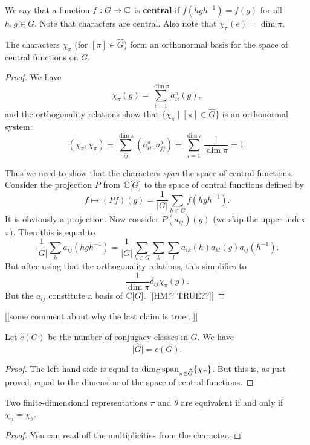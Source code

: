 \documentclass[11pt, english]{article}
\begin{document}
We say that a function $f:G \to \mathbb{C}$ is \textbf{central} if $f(hgh^{-1})=f(g)$ for all $h,g \in G$. Note that characters are central. Also note that $\chi_\pi(e)=\dim \pi$. 

\begin{thm}
 The characters $\chi_\pi$ (for $[\pi] \in \widehat G$) form an orthonormal basis for the space of central functions on $G$.
\end{thm}
\begin{proof}
 We have
$$
\chi_\pi(g) = \sum_{i=1}^{\dim \pi} a_{ii}^\pi(g),
$$
and the orthogonality relations show that $\{ \chi_\pi \mid [\pi] \in \widehat G \}$ is an orthonormal system:
$$
(\chi_\pi, \chi_\pi) = \sum_{ij}^{\dim \pi} (a_{ii}^\pi, a_{jj}^\pi) = 
\sum_{i=1}^{\dim \pi} \frac{1}{\dim \pi} = 1.
$$

Thus we need to show that the characters \emph{span} the space of central functions. Consider the projection $P$ from $\mathbb{C}[G]$ to the space of central functions defined by
$$
f \mapsto (Pf)(g) = \frac{1}{\lvert G \rvert }\sum_{h \in G} f(hgh^{-1}).
$$
It is obviously a projection. Now consider $P(a_{ij})(g)$ (we skip the upper index $\pi$). Then this is equal to
$$
\frac{1}{\lvert G \rvert} \sum_h a_{ij}(hgh^{-1}) = \frac{1}{\lvert G \rvert} \sum_{h \in G} \sum_k \sum_l a_{ik}(h) a_{kl}(g) a_{lj}(h^{-1}).
$$
But after using that the orthogonality relations, this simplifies to
$$
\frac{1}{\dim \pi} \delta_{ij} \chi_\pi(g).
$$
But the $a_{ij}$ constitute a basis of $\mathbb{C}[G]$. [[HM!? TRUE??]]
\end{proof}

[[some comment about why the last claim is true...]]

\begin{corr}
Let $c(G)$ be the number of conjugacy classes in $G$. We have
$$
\lvert \widehat G \rvert = c(G).
$$
\end{corr}
\begin{proof}
 The left hand side is equal to $\dim_{\mathbb{C}} \text{span}_{\pi \in \widehat G} \{ \chi_\pi \}$. But this is, as just proved, equal to the dimension of the space of central functions.
\end{proof}

\begin{corr}
 Two finite-dimensional representations $\pi$ and $\theta$ are equivalent if and only if $\chi_\pi = \chi_\theta$.
\end{corr}
\begin{proof}
  You can read off the multiplicities from the character.
\end{proof}
\end{document}
